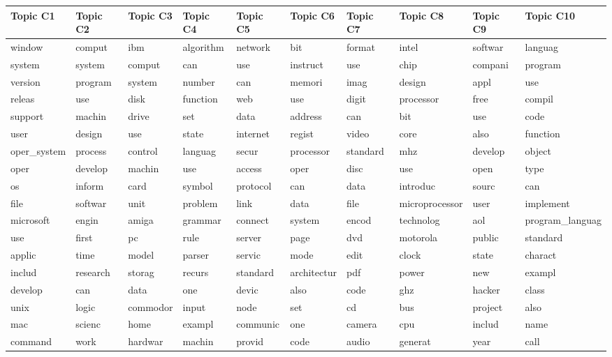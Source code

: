 \documentclass[
  letterpaper,
]{report}
\begin{document}
\begin{table}
\centering
\begin{tabular}{l|l|l|l|l|l|l|l|l|l}
\hline
Topic C1 & Topic C2 & Topic C3 & Topic C4 & Topic C5 & Topic C6 & Topic C7 & Topic C8 & Topic C9 & Topic C10\\
\hline
window & comput & ibm & algorithm & network & bit & format & intel & softwar & languag\\
\hline
system & system & comput & can & use & instruct & use & chip & compani & program\\
\hline
version & program & system & number & can & memori & imag & design & appl & use\\
\hline
releas & use & disk & function & web & use & digit & processor & free & compil\\
\hline
support & machin & drive & set & data & address & can & bit & use & code\\
\hline
user & design & use & state & internet & regist & video & core & also & function\\
\hline
oper\_system & process & control & languag & secur & processor & standard & mhz & develop & object\\
\hline
oper & develop & machin & use & access & oper & disc & use & open & type\\
\hline
os & inform & card & symbol & protocol & can & data & introduc & sourc & can\\
\hline
file & softwar & unit & problem & link & data & file & microprocessor & user & implement\\
\hline
microsoft & engin & amiga & grammar & connect & system & encod & technolog & aol & program\_languag\\
\hline
use & first & pc & rule & server & page & dvd & motorola & public & standard\\
\hline
applic & time & model & parser & servic & mode & edit & clock & state & charact\\
\hline
includ & research & storag & recurs & standard & architectur & pdf & power & new & exampl\\
\hline
develop & can & data & one & devic & also & code & ghz & hacker & class\\
\hline
unix & logic & commodor & input & node & set & cd & bus & project & also\\
\hline
mac & scienc & home & exampl & communic & one & camera & cpu & includ & name\\
\hline
command & work & hardwar & machin & provid & code & audio & generat & year & call\\

\end{tabular}
\end{table}
\end{document}
